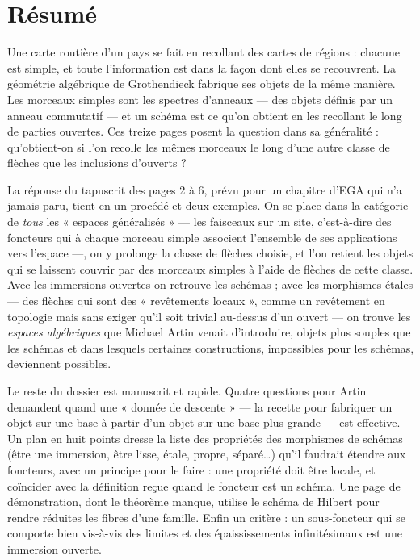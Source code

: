 \documentclass[11pt,a4paper]{article}
\begin{document}
\section*{Résumé}

\begin{resume}
Une carte routière d'un pays se fait en recollant des cartes de régions :
chacune est simple, et toute l'information est dans la façon dont elles se
recouvrent. La géométrie algébrique de Grothendieck fabrique ses objets de la
même manière. Les morceaux simples sont les spectres d'anneaux — des objets
définis par un anneau commutatif — et un schéma est ce qu'on obtient en les
recollant le long de parties ouvertes. Ces treize pages posent la question
dans sa généralité : qu'obtient-on si l'on recolle les mêmes morceaux le long
d'une autre classe de flèches que les inclusions d'ouverts ?

La réponse du tapuscrit des pages 2 à 6, prévu pour un chapitre d'EGA qui n'a
jamais paru, tient en un procédé et deux exemples. On se place dans la
catégorie de \emph{tous} les « espaces généralisés » — les faisceaux sur un
site, c'est-à-dire des foncteurs qui à chaque morceau simple associent
l'ensemble de ses applications vers l'espace —, on y prolonge la classe de
flèches choisie, et l'on retient les objets qui se laissent couvrir par des
morceaux simples à l'aide de flèches de cette classe. Avec les immersions
ouvertes on retrouve les schémas ; avec les morphismes étales — des flèches
qui sont des « revêtements locaux », comme un revêtement en topologie mais
sans exiger qu'il soit trivial au-dessus d'un ouvert — on trouve les
\emph{espaces algébriques} que Michael Artin venait d'introduire, objets plus
souples que les schémas et dans lesquels certaines constructions, impossibles
pour les schémas, deviennent possibles.

Le reste du dossier est manuscrit et rapide. Quatre questions pour Artin
demandent quand une « donnée de descente » — la recette pour fabriquer un
objet sur une base à partir d'un objet sur une base plus grande — est
effective. Un plan en huit points dresse la liste des propriétés des
morphismes de schémas (être une immersion, être lisse, étale, propre, séparé…)
qu'il faudrait étendre aux foncteurs, avec un principe pour le faire : une
propriété doit être locale, et coïncider avec la définition reçue quand le
foncteur est un schéma. Une page de démonstration, dont le théorème manque,
utilise le schéma de Hilbert pour rendre réduites les fibres d'une famille.
Enfin un critère : un sous-foncteur qui se comporte bien vis-à-vis des
limites et des épaississements infinitésimaux est une immersion ouverte.


\end{resume}
\end{document}
